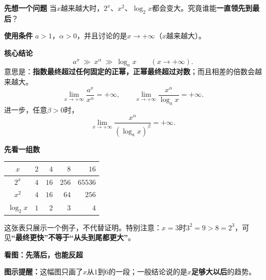 \begin{statementbox}
	\textbf{\textcolor{CStatement}{先想一个问题}}
	当$x$越来越大时，$2^x$、$x^2$、$\log_2x$都会变大。究竟谁能\textbf{一直领先到最后}？

	\medskip
	\textbf{\textcolor{CStatement}{使用条件}}
	$a>1$，$\alpha>0$，并且讨论的是$x\to+\infty$（$x$越来越大）。

	\medskip
	\textbf{\textcolor{CStatement}{核心结论}}
	\[
		\boxed{a^x\ \gg\ x^\alpha\ \gg\ \log_a x}\qquad(x\to+\infty).
	\]
	意思是：\textbf{指数最终超过任何固定的正幂，正幂最终超过对数}；而且相差的倍数会越来越大。
	\[
		\lim_{x\to+\infty}\frac{a^x}{x^\alpha}=+\infty,
		\qquad
		\lim_{x\to+\infty}\frac{x^\alpha}{\log_a x}=+\infty.
	\]
	进一步，任意$\beta>0$时，
	\[
		\lim_{x\to+\infty}\frac{x^\alpha}{(\log_a x)^\beta}=+\infty.
	\]

	\medskip
	\textbf{\textcolor{CStatement}{先看一组数}}
	\begin{center}
	\begin{tabular}{c|rrrr}
		$x$ & $2$ & $4$ & $8$ & $16$\\ \hline
		$2^x$ & $4$ & $16$ & $256$ & $65536$\\
		$x^2$ & $4$ & $16$ & $64$ & $256$\\
		$\log_2x$ & $1$ & $2$ & $3$ & $4$
	\end{tabular}
	\end{center}
	这张表只展示一个例子，不代替证明。特别注意：$x=3$时$3^2=9>8=2^3$，可见\textbf{“最终更快”不等于“从头到尾都更大”}。

	\medskip
	\textbf{\textcolor{CStatement}{看图：先落后，也能反超}}
	\begin{center}
	
	\end{center}
	\textbf{图示提醒：}这幅图只画了$x$从$1$到$6$的一段；一般结论说的是$x$\textbf{足够大以后}的趋势。
\end{statementbox}
